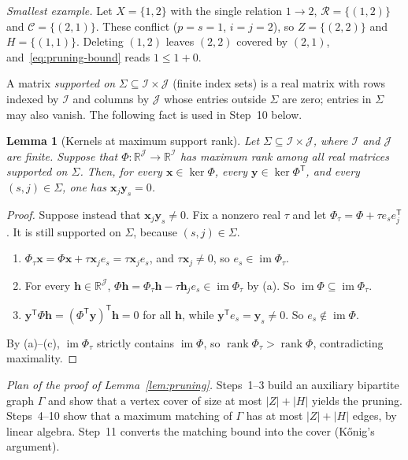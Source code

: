 \documentclass[11pt]{article}
\newtheorem{lemma}[theorem]{Lemma}
\theoremstyle{remark}
\newcommand{\abs}[1]{\lvert #1\rvert}
\DeclareMathOperator{\rank}{rank}
\DeclareMathOperator{\im}{im}
\newcommand{\R}{\mathbb R}
\begin{document}
\emph{Smallest example.}  Let $X=\{1,2\}$ with the single relation $1\to2$,
$\mathcal R=\{(1,2)\}$ and $\mathcal C=\{(2,1)\}$.  These conflict
($p=s=1$, $i=j=2$), so $Z=\{(2,2)\}$ and $H=\{(1,1)\}$.  Deleting $(1,2)$
leaves $(2,2)$ covered by $(2,1)$, and~\eqref{eq:pruning-bound} reads
$1\le1+0$.

\medskip
A matrix \emph{supported on} $\Sigma\subseteq\mathcal I\times\mathcal J$
(finite index sets) is a real matrix with rows indexed by $\mathcal I$ and
columns by $\mathcal J$ whose entries outside $\Sigma$ are zero; entries in
$\Sigma$ may also vanish.  The following fact is used in Step~10 below.

\begin{lemma}[Kernels at maximum support rank]\label{lem:kernel-support}
Let $\Sigma\subseteq\mathcal I\times\mathcal J$, where $\mathcal I$ and
$\mathcal J$ are finite.  Suppose that
$\Phi:\R^{\mathcal J}\to\R^{\mathcal I}$ has maximum rank among all real
matrices supported on $\Sigma$.  Then, for every $\mathbf x\in\ker\Phi$,
every $\mathbf y\in\ker\Phi^{\mathsf T}$, and every $(s,j)\in\Sigma$, one has
$\mathbf x_j\mathbf y_s=0$.
\end{lemma}

\begin{proof}
Suppose instead that $\mathbf x_j\mathbf y_s\ne0$.  Fix a nonzero real
$\tau$ and let $\Phi_\tau=\Phi+\tau e_s e_j^{\mathsf T}$.  It is still
supported on $\Sigma$, because $(s,j)\in\Sigma$.
\begin{enumerate}[label=\textup{(\alph*)},nosep]
\item $\Phi_\tau\mathbf x=\Phi\mathbf x+\tau\mathbf x_je_s
 =\tau\mathbf x_j e_s$, and $\tau\mathbf x_j\neq0$, so
 $e_s\in\im\Phi_\tau$.
\item For every $\mathbf h\in\R^{\mathcal J}$,
 $\Phi\mathbf h=\Phi_\tau\mathbf h-\tau\mathbf h_j e_s\in\im\Phi_\tau$
 by (a).  So $\im\Phi\subseteq\im\Phi_\tau$.
\item $\mathbf y^{\mathsf T}\Phi\mathbf h
 =(\Phi^{\mathsf T}\mathbf y)^{\mathsf T}\mathbf h=0$ for all $\mathbf h$,
 while $\mathbf y^{\mathsf T}e_s=\mathbf y_s\ne0$.  So $e_s\notin\im\Phi$.
\end{enumerate}
By (a)--(c), $\im\Phi_\tau$ strictly contains $\im\Phi$, so
$\rank\Phi_\tau>\rank\Phi$, contradicting maximality.
\end{proof}

\emph{Plan of the proof of Lemma~\ref{lem:pruning}.}
Steps~1--3 build an auxiliary bipartite graph $\Gamma$ and show that a vertex
cover of size at most $\abs Z+\abs H$ yields the pruning.
Steps~4--10 show that a maximum matching of $\Gamma$ has at most
$\abs Z+\abs H$ edges, by linear algebra.  Step~11 converts the matching bound
into the cover (K\H{o}nig's argument).
\end{document}
